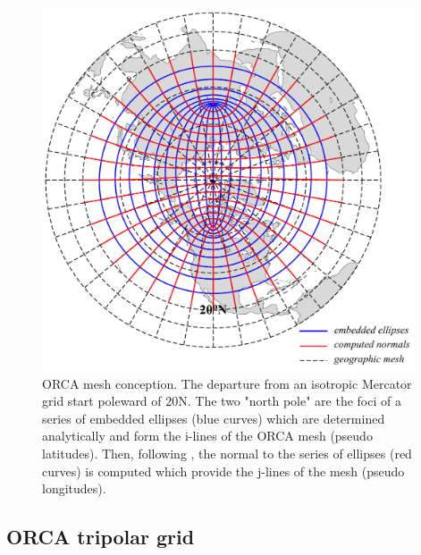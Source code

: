 \begin{figure}[!t]   \begin{center}
\includegraphics[width=0.98\textwidth]{./TexFiles/Figures/Fig_ORCA_NH_mesh.pdf}
\caption{  \label{Fig_MISC_ORCA_msh}     
ORCA mesh conception. The departure from an isotropic Mercator grid start poleward of 20\deg N.
The two "north pole" are the foci of a series of embedded ellipses (blue curves) 
which are determined analytically and form the i-lines of the ORCA mesh (pseudo latitudes). 
Then, following \citet{Madec_Imbard_CD96}, the normal to the series of ellipses (red curves) is computed 
which provide the j-lines of the mesh (pseudo longitudes).  }
\end{center}   \end{figure}

\subsection{ORCA tripolar grid}
\label{CFG_orca_grid}

